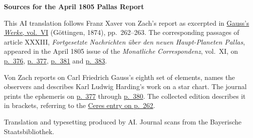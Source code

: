 \clearpage\thispagestyle{empty}
\begin{center}\textbf{Sources for the April 1805 Pallas Report}\end{center}
\noindent This AI translation follows Franz Xaver von Zach’s report as excerpted in \href{https://gdz.sub.uni-goettingen.de/id/PPN236007467}{Gauss’s \textit{Werke}, vol.~VI} (Göttingen, 1874), pp.~262--263. The corresponding passages of article XXXIII, \textit{Fortgesetzte Nachrichten über den neuen Haupt-Planeten Pallas}, appeared in the April 1805 issue of the \textit{Monatliche Correspondenz}, vol.~XI, on \href{https://www.digitale-sammlungen.de/en/view/bsb10538603?page=388}{p.~376}, \href{https://www.digitale-sammlungen.de/en/view/bsb10538603?page=389}{p.~377}, \href{https://www.digitale-sammlungen.de/en/view/bsb10538603?page=393}{p.~381} and \href{https://www.digitale-sammlungen.de/en/view/bsb10538603?page=395}{p.~383}.
\par\smallskip\noindent Von Zach reports on Carl Friedrich Gauss’s eighth set of elements, names the observers and describes Karl Ludwig Harding’s work on a star chart. The journal prints the ephemeris on \href{https://www.digitale-sammlungen.de/en/view/bsb10538603?page=389}{p.~377} through \href{https://www.digitale-sammlungen.de/en/view/bsb10538603?page=392}{p.~380}. The collected edition describes it in brackets, referring to the \hyperlink{native-267}{Ceres entry on p.~262}.
\par\smallskip\noindent Translation and typesetting produced by AI. Journal scans from the Bayerische Staatsbibliothek.
\clearpage
